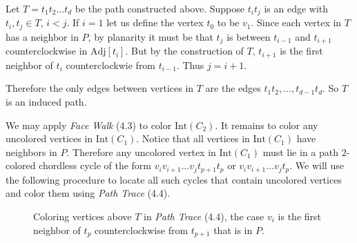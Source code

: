 \documentclass[letterpaper, 12pt]{article}
\theoremstyle{definition}
\theoremstyle{definition}
\theoremstyle{thm}
\theoremstyle{definition}
\begin{document}
Let $T=t_1t_2\ldots t_d$ be the path constructed above. Suppose $t_it_j$ is an
edge with $t_i,t_j\in T$, $i<j$. If $i=1$ let us define the vertex $t_0$ to be
$v_1$. Since each vertex in $T$ has a neighbor in
$P$, by planarity it must be that $t_j$ is between $t_{i-1}$ and $t_{i+1}$
counterclockwise in $\text{Adj}[t_i]$. But by the construction of
$T$, $t_{i+1}$ is the first neighbor of $t_i$ counterclockwie from $t_{i-1}$.
Thus $j=i+1$.

Therefore the only edges between vertices in $T$ are the edges $t_1t_2,\ldots,
t_{d-1}t_d$. So $T$ is an induced path.


We may apply \textit{Face Walk} (4.3) to color $\text{Int}(C_2)$. It remains
to color any uncolored vertices in $\text{Int}(C_1)$. Notice that all vertices
in $\text{Int}(C_1)$ have neighbors in $P$. Therefore any uncolored
vertex in $\text{Int}(C_1)$ must lie in a path $2$-colored chordless cycle of
the form $v_iv_{i+1}\ldots v_jt_{p+1}t_p$ or $v_iv_{i+1}\ldots v_jt_p$.
We will use the following procedure to locate all such cycles that contain
uncolored vertices and color them using \textit{Path Trace} (4.4).

\begin{figure}
\begin{center}

\caption{Coloring vertices above $T$ in \textit{Path Trace} (4.4), the case
$v_i$ is the first neighbor of $t_p$ counterclockwise from $t_{p+1}$ that is in
$P$.}
\end{center}
\end{figure}
\end{document}
